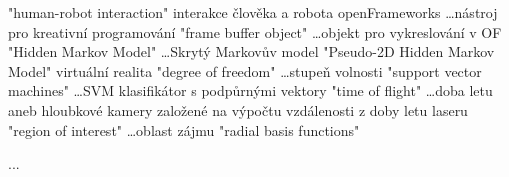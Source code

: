 
\abbrv[HRI]	"human-robot interaction" \dot interakce člověka a robota
\abbrv[OF]	openFrameworks \dots nástroj pro kreativní programování
\abbrv[FBO]  "frame buffer object" \dots objekt pro vykreslování v OF
\abbrv[HMM]  "Hidden Markov Model" \dots Skrytý Markovův model
\abbrv[P2DHMM]  "Pseudo-2D Hidden Markov Model"
\abbrv[VR]  virtuální realita
\abbrv[DOF]  "degree of freedom" \dots stupeň volnosti
\abbrv[SVM]  "support vector machines" \dots SVM klasifikátor s podpůrnými vektory
\abbrv[TOF]  "time of flight" \dots doba letu aneb hloubkové kamery založené na výpočtu vzdálenosti z doby letu laseru
\abbrv[ROI]  "region of interest" \dots oblast zájmu
\abbrv[RBF]  "radial basis functions"

\abbrv[...]     ...
\stopAbbreviations

\endinput
